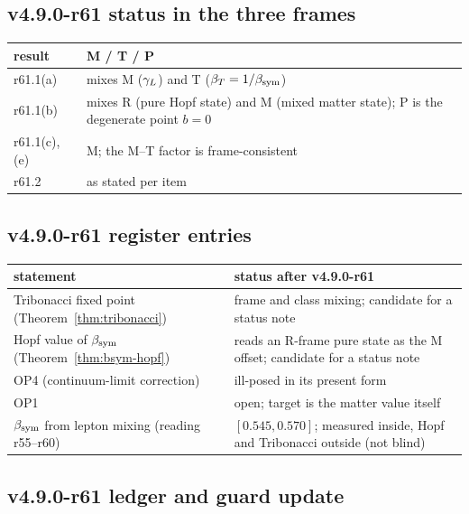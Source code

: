 \subsection*{v4.9.0-r61 status in the three frames}
\label{subsec:v490-r61-frames}

\begin{center}
\small
\begin{tabular}{@{}>{\raggedright\arraybackslash}p{}>{\raggedright\arraybackslash}p{}@{}}
\toprule
result & M / T / P\\
\midrule
r61.1(a) & mixes M (\(\gamma_L\)) and T (\(\beta_T=1/\beta_{\mathrm{sym}}\))\\
r61.1(b) & mixes R (pure Hopf state) and M (mixed matter state); P is the degenerate point \(b=0\)\\
r61.1(c), (e) & M; the M--T factor is frame-consistent\\
r61.2 & as stated per item\\
\bottomrule
\end{tabular}
\end{center}

\subsection*{v4.9.0-r61 register entries}
\label{subsec:v490-r61-register}

\begin{center}
\small
\begin{tabular}{@{}>{\raggedright\arraybackslash}p{}>{\raggedright\arraybackslash}p{}@{}}
\toprule
statement & status after v4.9.0-r61\\
\midrule
Tribonacci fixed point (Theorem~\ref{thm:tribonacci}) & frame and class mixing; candidate for a status note\\
Hopf value of \(\beta_{\mathrm{sym}}\) (Theorem~\ref{thm:bsym-hopf}) & reads an R-frame pure state as the M offset; candidate for a status note\\
OP4 (continuum-limit correction) & ill-posed in its present form\\
OP1 & open; target is the matter value itself\\
\(\beta_{\mathrm{sym}}\) from lepton mixing (reading r55--r60) & \([0.545,0.570]\); measured inside, Hopf and Tribonacci outside (not blind)\\
\bottomrule
\end{tabular}
\end{center}

\subsection*{v4.9.0-r61 ledger and guard update}
\label{subsec:v490-r61-ledger-guard}

